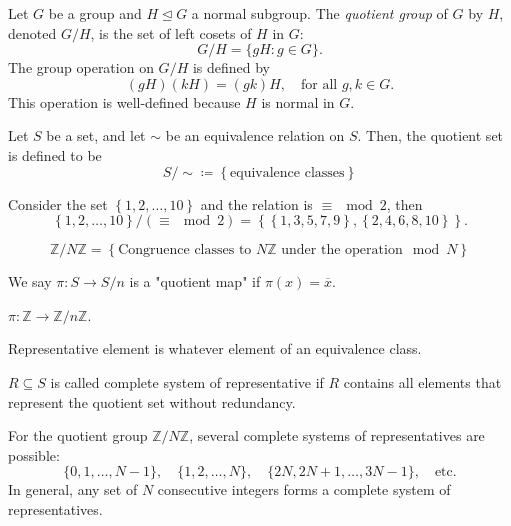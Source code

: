 
\begin{definition}
    Let $G$ be a group and $H \trianglelefteq G$ a normal subgroup. 
    The \emph{quotient group} of $G$ by $H$, denoted $G/H$, is the set of left cosets of $H$ in $G$:
    \[
        G/H = \{ gH : g \in G \}.
    \]
    The group operation on $G/H$ is defined by
    \[
        (gH)(kH) = (gk)H, \quad \text{for all } g,k \in G.
    \]
    This operation is well-defined because $H$ is normal in $G$.
\end{definition}


\begin{definition} \label{def: quotient map}
    Let \(S\) be a set, and let \(\sim \) be an equivalence relation on \(S\). Then, the quotient set is defined to be
    \[
        S / \sim \coloneqq  \left\{ \text{equivalence classes} \right\} 
    \]    
\end{definition}

\begin{eg}
    Consider the set \(\left\{ 1,2, \dots , 10 \right\} \) and the relation is \(\equiv \mod{2}\), then
    \[
        \left\{ 1,2,\dots ,10 \right\} / (\equiv \mod{2}) = \left\{ \left\{ 1,3,5,7,9 \right\}, \left\{ 2,4,6,8,10 \right\}   \right\}. 
    \]  
\end{eg}

\begin{eg}
    \[
        \mathbb{Z} / N \mathbb{Z} = \left\{ \text{Congruence classes to } N\mathbb{Z} \text{ under the operation} \mod{N}  \right\}  
    \]
\end{eg}

\begin{definition} \label{def: quotient map}
    We say \(\pi : S \to S / n\) is a "quotient map" if \(\pi (x) = \overline{x} \).  
\end{definition}

\begin{eg}
    \(\pi : \mathbb{Z} \to \mathbb{Z} / n \mathbb{Z} \). 
\end{eg}

\begin{definition}
    Representative element is whatever element of an equivalence class.
\end{definition}

\begin{definition}
    \(R \subseteq S\) is called complete system of representative if \(R\) contains all elements that represent the quotient set without redundancy.   
\end{definition}
\begin{eg}
For the quotient group $\mathbb{Z}/N\mathbb{Z}$, several complete systems of representatives are possible:
\[
\{0,1,\dots,N-1\}, \quad
\{1,2,\dots,N\}, \quad
\{2N,2N+1,\dots,3N-1\}, \quad \text{etc.}
\]
In general, any set of $N$ consecutive integers forms a complete system of representatives.
\end{eg}

